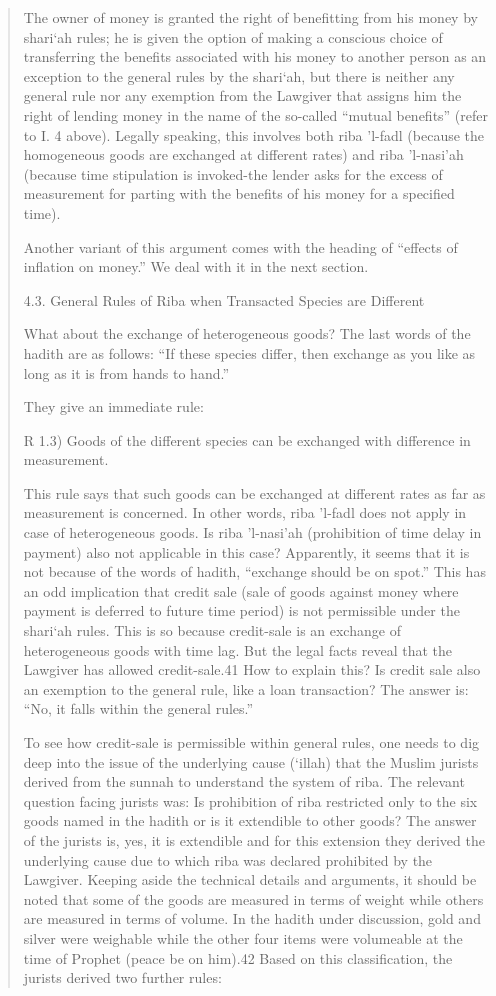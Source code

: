 \begin{quote}
The owner of money is granted the right of benefitting from his money by shari‘ah rules; he is given the option of making a conscious choice of transferring the benefits associated with his money to another person as an exception to the general rules by the shari‘ah, but there is neither any general rule nor any exemption from the Lawgiver that assigns him the right of lending money in the name of the so-called “mutual benefits” (refer to I. 4 above). Legally speaking, this involves both riba 'l-fadl (because the homogeneous goods are exchanged at different rates) and riba 'l-nasi'ah (because time stipulation is invoked-the lender asks for the excess of measurement for parting with the benefits of his money for a specified time).

Another variant of this argument comes with the heading of “effects of inflation on money.” We deal with it in the next section.

4.3. General Rules of Riba when Transacted Species are Different

What about the exchange of heterogeneous goods? The last words of the hadith are as follows: “If these species differ, then exchange as you like as long as it is from hands to hand.”

They give an immediate rule:

R 1.3) Goods of the different species can be exchanged with difference in measurement.

This rule says that such goods can be exchanged at different rates as far as measurement is concerned. In other words, riba 'l-fadl does not apply in case of heterogeneous goods. Is riba 'l-nasi'ah (prohibition of time delay in payment) also not applicable in this case? Apparently, it seems that it is not because of the words of hadith, “exchange should be on spot.” This has an odd implication that credit sale (sale of goods against money where payment is deferred to future time period) is not permissible under the shari‘ah rules. This is so because credit-sale is an exchange of heterogeneous goods with time lag. But the legal facts reveal that the Lawgiver has allowed credit-sale.41 How to explain this? Is credit sale also an exemption to the general rule, like a loan transaction? The answer is: “No, it falls within the general rules.”

To see how credit-sale is permissible within general rules, one needs to dig deep into the issue of the underlying cause (‘illah) that the Muslim jurists derived from the sunnah to understand the system of riba. The relevant question facing jurists was: Is prohibition of riba restricted only to the six goods named in the hadith or is it extendible to other goods? The answer of the jurists is, yes, it is extendible and for this extension they derived the underlying cause due to which riba was declared prohibited by the Lawgiver. Keeping aside the technical details and arguments, it should be noted that some of the goods are measured in terms of weight while others are measured in terms of volume. In the hadith under discussion, gold and silver were weighable while the other four items were volumeable at the time of Prophet (peace be on him).42 Based on this classification, the jurists derived two further rules:


\end{quote}
